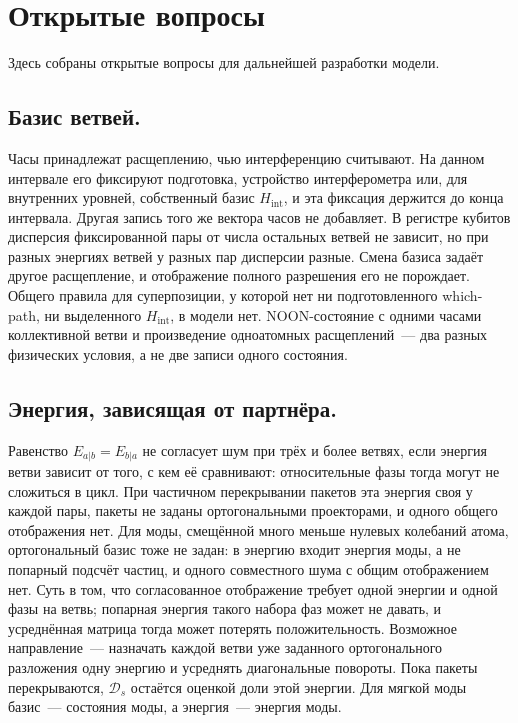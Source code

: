 \documentclass[12pt,a4paper]{article}
\begin{document}
\section{Открытые вопросы}
\label{sec:open}

Здесь собраны открытые вопросы для дальнейшей разработки модели.

\subsection{Базис ветвей.}
\label{sec:open_basis}
Часы принадлежат расщеплению, чью интерференцию считывают. На данном интервале его фиксируют подготовка, устройство интерферометра или, для внутренних уровней, собственный базис $H_{\mathrm{int}}$, и эта фиксация держится до конца интервала. Другая запись того же вектора часов не добавляет. В регистре кубитов дисперсия фиксированной пары от числа остальных ветвей не зависит, но при разных энергиях ветвей у разных пар дисперсии разные. Смена базиса задаёт другое расщепление, и отображение полного разрешения его не порождает. Общего правила для суперпозиции, у которой нет ни подготовленного which-path, ни выделенного $H_{\mathrm{int}}$, в модели нет. NOON-состояние с одними часами коллективной ветви и произведение одноатомных расщеплений~--- два разных физических условия, а не две записи одного состояния.

\subsection{Энергия, зависящая от партнёра.}
\label{sec:open_pair}
Равенство $E_{a|b}=E_{b|a}$ не согласует шум при трёх и более ветвях, если энергия ветви зависит от того, с кем её сравнивают: относительные фазы тогда могут не сложиться в цикл. При частичном перекрывании пакетов эта энергия своя у каждой пары, пакеты не заданы ортогональными проекторами, и одного общего отображения нет. Для моды, смещённой много меньше нулевых колебаний атома, ортогональный базис тоже не задан: в энергию входит энергия моды, а не попарный подсчёт частиц, и одного совместного шума с общим отображением нет. Суть в том, что согласованное отображение требует одной энергии и одной фазы на ветвь; попарная энергия такого набора фаз может не давать, и усреднённая матрица тогда может потерять положительность. Возможное направление~--- назначать каждой ветви уже заданного ортогонального разложения одну энергию и усреднять диагональные повороты. Пока пакеты перекрываются, $\mathcal D_s$ остаётся оценкой доли этой энергии. Для мягкой моды базис~--- состояния моды, а энергия~--- энергия моды.
\end{document}

